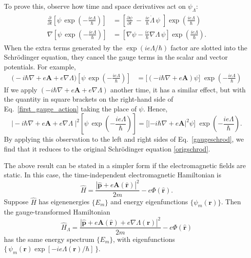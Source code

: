 \documentclass[prx,12pt]{revtex4-2}
\begin{document}
To prove this, observe how time and space derivatives act on $\psi_\Lambda$:
\begin{align}
  \begin{aligned}
    \frac{\partial}{\partial t} \left[\psi \, \exp\left(-\frac{ie\Lambda}{\hbar}\right)\right] &=
    \left[\frac{\partial\psi}{\partial t} \;-\; \frac{ie}{\hbar} \dot{\Lambda}\, \psi
      \,\, \right] \exp\left(\frac{ie\Lambda}{\hbar}\right)\\
    \nabla \left[\psi \, \exp\left(-\frac{ie\Lambda}{\hbar}\right)\right] &=
    \left[\nabla \psi - \frac{ie}{\hbar} \nabla \Lambda \,\psi \right] \exp\left(\frac{ie\Lambda}{\hbar}\right).
  \end{aligned}
\end{align}
When the extra terms generated by the $\exp(ie\Lambda/\hbar)$ factor
are slotted into the Schr\"odinger equation, they cancel the gauge
terms in the scalar and vector potentials.  For example,
\begin{align}
  \Big(-i\hbar\nabla + e\mathbf{A} + e\nabla\Lambda\Big)
  \left[\psi \, \exp\left(-\frac{ie\Lambda}{\hbar}\right)\right] &=
  \Big[\left(-i\hbar\nabla + e\mathbf{A}\right)\psi\Big]\;
  \exp\left(-\frac{ie\Lambda}{\hbar}\right)
  \label{first_gauge_action}
\end{align}
If we apply $(-i\hbar\nabla + e\mathbf{A} + e\nabla\Lambda)$ another
time, it has a similar effect, but with the quantity in square
brackets on the right-hand side of Eq.~\eqref{first_gauge_action}
taking the place of $\psi$.  Hence,
\begin{equation}
  \Big|-i\hbar\nabla + e\mathbf{A} + e\nabla\Lambda\;\Big|^2
  \left[\psi \, \exp\left(-\frac{ie\Lambda}{\hbar}\right)\right]  
  =   \Big[\left|-i\hbar\nabla + e\mathbf{A}\right|^2\psi\Big]\;
  \exp\left(-\frac{ie\Lambda}{\hbar}\right).
\end{equation}
By applying this observation to the left and right sides of
Eq.~\eqref{gaugeschrod}, we find that it reduces to the original
Schr\"odinger equation \eqref{origschrod}.

The above result can be stated in a simpler form if the
electromagnetic fields are static.  In this case, the time-independent
electromagnetic Hamiltonian is
\begin{equation}
  \hat{H} = \frac{|\hat{\mathbf{p}}+e\mathbf{A}(\hat{\mathbf{r}})|^2}{2m}
  - e\Phi(\hat{\mathbf{r}}).
\end{equation}
Suppose $\hat{H}$ has eigenenergies $\{E_m \}$ and energy
eigenfunctions $\{\psi_m(\mathbf{r})\}$.  Then the gauge-transformed
Hamiltonian
\begin{equation}
  \hat{H}_\Lambda = \frac{|\hat{\mathbf{p}}+e\mathbf{A}(\hat{\mathbf{r}}) + e\nabla\Lambda(\mathbf{r})|^2}{2m}
  - e\Phi(\hat{\mathbf{r}})
\end{equation}
has the same energy spectrum $\{E_m\}$, with eigenfunctions
$\{\,\psi_m(\mathbf{r}) \exp[-ie\Lambda(\mathbf{r})/\hbar]\,\}$.
\end{document}
